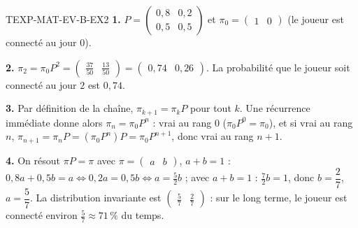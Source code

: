 \begin{corrige}{TEXP-MAT-EV-B-EX2}
\textbf{1.} $P=\begin{pmatrix}0{,}8&0{,}2\\0{,}5&0{,}5\end{pmatrix}$ et $\pi_0=\begin{pmatrix}1&0\end{pmatrix}$ (le joueur est connecté au jour $0$).

\textbf{2.} $\pi_2=\pi_0P^2=\begin{pmatrix}\tfrac{37}{50}&\tfrac{13}{50}\end{pmatrix}=\begin{pmatrix}0{,}74&0{,}26\end{pmatrix}$. La probabilité que le joueur soit connecté au jour $2$ est $0{,}74$.

\textbf{3.} Par définition de la chaîne, $\pi_{k+1}=\pi_kP$ pour tout $k$. Une récurrence immédiate donne alors $\pi_n=\pi_0P^n$ : vrai au rang $0$ ($\pi_0P^0=\pi_0$), et si vrai au rang $n$, $\pi_{n+1}=\pi_nP=(\pi_0P^n)P=\pi_0P^{n+1}$, donc vrai au rang $n+1$.

\textbf{4.} On résout $\pi P=\pi$ avec $\pi=\begin{pmatrix}a&b\end{pmatrix}$, $a+b=1$ : $0{,}8a+0{,}5b=a\iff0{,}2a=0{,}5b\iff a=\tfrac{5}{2}b$ ; avec $a+b=1$ : $\tfrac{7}{2}b=1$, donc $b=\dfrac{2}{7}$, $a=\dfrac{5}{7}$. La distribution invariante est $\begin{pmatrix}\tfrac{5}{7}&\tfrac{2}{7}\end{pmatrix}$ : sur le long terme, le joueur est connecté environ $\tfrac{5}{7}\approx71\,\%$ du temps.
\end{corrige}
